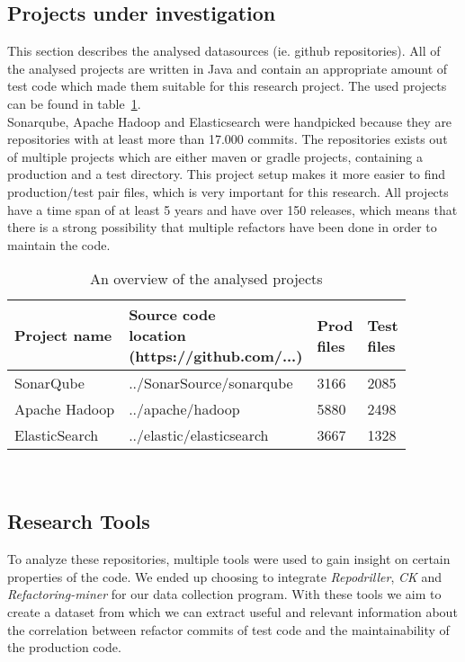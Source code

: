 \subsection{Projects under investigation}
 This section describes the analysed datasources (ie. github repositories). All of the analysed projects are written in Java and contain an appropriate amount of test code which made them suitable for this research project. The used projects can be found in table~\ref{table:1}.\\
 Sonarqube, Apache Hadoop and Elasticsearch were handpicked because they are repositories with at least more than 17.000 commits. The repositories exists out of multiple projects which are either maven or gradle projects, containing a production and a test directory. This project setup makes it more easier to find production/test pair files, which is very important for this research. All projects have a time span of at least 5 years and have over 150 releases, which means that there is a strong possibility that multiple refactors have been done in order to maintain the code.
 \\
\begin{table}[h!]
    \centering
    \begin{tabular}{l | l | l |l} 
     \hline 
     \textbf{Project name} & \thead{\textbf{Source code}\\\textbf{location}\\\tiny(https://github.com/...)\normalsize} & \thead{Prod\\files} & \thead{Test\\files} \\
     \hline
     SonarQube & ../SonarSource/sonarqube  & 3166 & 2085\\
     Apache Hadoop & ../apache/hadoop & 5880 & 2498 \\ 
     ElasticSearch & ../elastic/elasticsearch & 3667 & 1328 \\
     \hline
    \end{tabular}
    \caption{An overview of the analysed projects}
    \label{table:1}
\end{table}\\

\subsection{Research Tools}\label{Researchtools}
To analyze these repositories, multiple tools were used to gain insight on certain properties of the code. We ended up choosing to integrate \textit{Repodriller}, \textit{CK} and \textit{Refactoring-miner} for our data collection program. With these tools we aim to create a dataset from which we can extract useful and relevant information about the correlation between refactor commits of test code and the maintainability of the production code.

